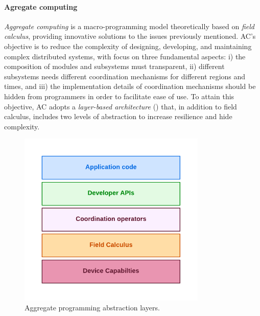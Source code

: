 \documentclass[12pt,a4paper,openright,twoside]{book}
\begin{document}
\paragraph{Agregate computing}
\emph{Aggregate computing} \cite{AC} is a macro-programming model theoretically based on \emph{field calculus}, providing innovative solutions
    to the issues previously mentioned. AC's objective is to reduce the complexity of designing, developing, 
    and maintaining complex distributed systems, with focus on three fundamental aspects:
    i) the composition of modules and subsystems must transparent,
    ii) different subsystems needs different coordination mechanisms for different regions and times, and 
    iii) the implementation details of coordination mechanisms should be hidden from programmers in order to facilitate ease of use.
    To attain this objective, AC adopts a \emph{layer-based architecture} () that, in addition to field calculus, 
    includes two levels of abstraction to increase resilience and hide complexity. 


\begin{figure}[t]
    \centering
    \includegraphics[width=0.8\textwidth]{figures/AC-layers.pdf}
    \caption{Aggregate programming abstraction layers.}
    \label{fig:ac-layers}
\end{figure}
\end{document}
